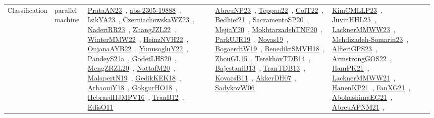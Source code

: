 {\begin{longtable}{lp{3cm}>{\raggedright\arraybackslash}p{6cm}>{\raggedright\arraybackslash}p{6cm}>{\raggedright\arraybackslash}p{8cm}}
Classification & parallel machine & \href{works/PrataAN23.pdf}{PrataAN23}~\cite{PrataAN23}, \href{works/abs-2305-19888.pdf}{abs-2305-19888}~\cite{abs-2305-19888}, \href{works/IsikYA23.pdf}{IsikYA23}~\cite{IsikYA23}, \href{works/CzerniachowskaWZ23.pdf}{CzerniachowskaWZ23}~\cite{CzerniachowskaWZ23}, \href{works/NaderiRR23.pdf}{NaderiRR23}~\cite{NaderiRR23}, \href{works/ZhangJZL22.pdf}{ZhangJZL22}~\cite{ZhangJZL22}, \href{works/WinterMMW22.pdf}{WinterMMW22}~\cite{WinterMMW22}, \href{works/HeinzNVH22.pdf}{HeinzNVH22}~\cite{HeinzNVH22}, \href{works/OujanaAYB22.pdf}{OujanaAYB22}~\cite{OujanaAYB22}, \href{works/YunusogluY22.pdf}{YunusogluY22}~\cite{YunusogluY22}, \href{works/PandeyS21a.pdf}{PandeyS21a}~\cite{PandeyS21a}, \href{works/GodetLHS20.pdf}{GodetLHS20}~\cite{GodetLHS20}, \href{works/MengZRZL20.pdf}{MengZRZL20}~\cite{MengZRZL20}, \href{works/NattafM20.pdf}{NattafM20}~\cite{NattafM20}, \href{works/MalapertN19.pdf}{MalapertN19}~\cite{MalapertN19}, \href{works/GedikKEK18.pdf}{GedikKEK18}~\cite{GedikKEK18}, \href{works/ArbaouiY18.pdf}{ArbaouiY18}~\cite{ArbaouiY18}, \href{works/GokgurHO18.pdf}{GokgurHO18}~\cite{GokgurHO18}, \href{works/HebrardHJMPV16.pdf}{HebrardHJMPV16}~\cite{HebrardHJMPV16}, \href{works/TranB12.pdf}{TranB12}~\cite{TranB12}, \href{works/EdisO11.pdf}{EdisO11}~\cite{EdisO11} & \href{works/AbreuNP23.pdf}{AbreuNP23}~\cite{AbreuNP23}, \href{works/Teppan22.pdf}{Teppan22}~\cite{Teppan22}, \href{works/ColT22.pdf}{ColT22}~\cite{ColT22}, \href{works/Bedhief21.pdf}{Bedhief21}~\cite{Bedhief21}, \href{works/SacramentoSP20.pdf}{SacramentoSP20}~\cite{SacramentoSP20}, \href{works/MejiaY20.pdf}{MejiaY20}~\cite{MejiaY20}, \href{works/MokhtarzadehTNF20.pdf}{MokhtarzadehTNF20}~\cite{MokhtarzadehTNF20}, \href{works/ParkUJR19.pdf}{ParkUJR19}~\cite{ParkUJR19}, \href{works/Novas19.pdf}{Novas19}~\cite{Novas19}, \href{works/BogaerdtW19.pdf}{BogaerdtW19}~\cite{BogaerdtW19}, \href{works/BenediktSMVH18.pdf}{BenediktSMVH18}~\cite{BenediktSMVH18}, \href{works/ZhouGL15.pdf}{ZhouGL15}~\cite{ZhouGL15}, \href{works/TerekhovTDB14.pdf}{TerekhovTDB14}~\cite{TerekhovTDB14}, \href{works/BajestaniB13.pdf}{BajestaniB13}~\cite{BajestaniB13}, \href{works/TranTDB13.pdf}{TranTDB13}~\cite{TranTDB13}, \href{works/KovacsB11.pdf}{KovacsB11}~\cite{KovacsB11}, \href{works/AkkerDH07.pdf}{AkkerDH07}~\cite{AkkerDH07}, \href{works/SadykovW06.pdf}{SadykovW06}~\cite{SadykovW06} & \href{works/KimCMLLP23.pdf}{KimCMLLP23}~\cite{KimCMLLP23}, \href{works/JuvinHHL23.pdf}{JuvinHHL23}~\cite{JuvinHHL23}, \href{works/LacknerMMWW23.pdf}{LacknerMMWW23}~\cite{LacknerMMWW23}, \href{works/Mehdizadeh-Somarin23.pdf}{Mehdizadeh-Somarin23}~\cite{Mehdizadeh-Somarin23}, \href{works/AlfieriGPS23.pdf}{AlfieriGPS23}~\cite{AlfieriGPS23}, \href{works/ArmstrongGOS22.pdf}{ArmstrongGOS22}~\cite{ArmstrongGOS22}, \href{works/HamPK21.pdf}{HamPK21}~\cite{HamPK21}, \href{works/LacknerMMWW21.pdf}{LacknerMMWW21}~\cite{LacknerMMWW21}, \href{works/HanenKP21.pdf}{HanenKP21}~\cite{HanenKP21}, \href{works/FanXG21.pdf}{FanXG21}~\cite{FanXG21}, \href{works/AbohashimaEG21.pdf}{AbohashimaEG21}~\cite{AbohashimaEG21}, \href{works/AbreuAPNM21.pdf}{AbreuAPNM21}~\cite{AbreuAPNM21}, 
\end{longtable}}
